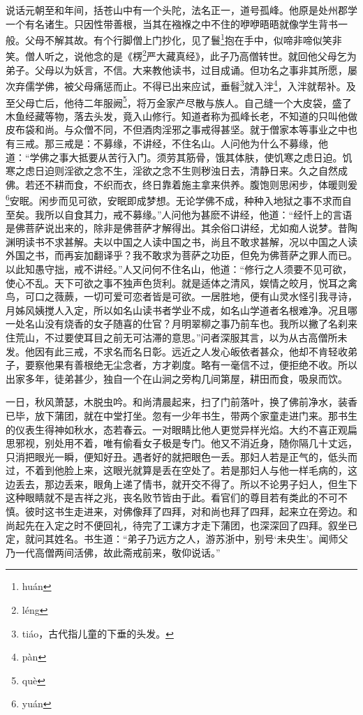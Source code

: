 \documentclass[a4paper,12pt,UTF8,twoside]{ctexbook}
\begin{document}
说话元朝至和年间，括苍山中有一个头陀，法名正一，道号孤峰。他原是处州郡学一个有名诸生。只因性带善根，当其在襁褓之中不住的咿咿晤晤就像学生背书一般。父母不解其故。有个行脚僧上门抄化，见了鬟\footnote{hu\'an}抱在手中，似啼非啼似笑非笑。僧人听之，说他念的是《楞\footnote{l\'eng}严大藏真经》，此子乃高僧转世。就回他父母乞为弟子。父母以为妖言，不信。大来教他读书，过目成诵。但功名之事非其所愿，屡次弃儒学佛，被父母痛惩而止。不得已出来应试，垂髫\footnote{ti\'ao，古代指儿童的下垂的头发。}就入泮\footnote{p\`an}，入泮就帮补。及至父母亡后，他待二年服阙\footnote{qu\`e}，将万金家产尽散与族人。自己缝一个大皮袋，盛了木鱼经藏等物，落去头发，竟入山修行。知道者称为孤峰长老，不知道的只叫他做皮布袋和尚。与众僧不同，不但酒肉淫邪之事戒得甚坚。就于僧家本等事业之中也有三戒。那三戒是：不募缘，不讲经，不住名山。人问他为什么不募缘，他道：“学佛之事大抵要从苦行入门。须劳其筋骨，饿其体肤，使饥寒之虑日迫。饥寒之虑日迫则淫欲之念不生，淫欲之念不生则秽浊日去，清静日来。久之自然成佛。若还不耕而食，不织而衣，终日靠着施主拿来供养。腹饱则思闲步，体暖则爰\footnote{yu\'an}安眠。闲步而见可欲，安眠即成梦想。无论学佛不成，种种入地狱之事不求而自至矣。我所以自食其力，戒不募缘。”人问他为甚麽不讲经，他道：“经忏上的言语是佛菩萨说出来的，除非是佛菩萨才解得出。其余俗口讲经，尤如痴人说梦。昔陶渊明读书不求甚解。夫以中国之人读中国之书，尚且不敢求甚解，况以中国之人读外国之书，而再妄加翻译乎？我不敢求为菩萨之功臣，但免为佛菩萨之罪人而已。以此知愚守拙，戒不讲经。”人又问何不住名山，他道：“修行之人须要不见可欲，使心不乱。天下可欲之事不独声色货利。就是适体之清风，娱情之皎月，悦耳之禽鸟，可口之薇蕨，一切可爱可恋者皆是可欲。一居胜地，便有山灵水怪引我寻诗，月姊风姨搅人入定，所以如名山读书者学业不成，如名山学道者名根难净。况且哪一处名山没有烧香的女子随喜的仕官？月明翠柳之事乃前车也。我所以撇了名刹来住荒山，不过要使耳目之前无可沽滞的意思。”问者深服其言，以为从古高僧所未发。他因有此三戒，不求名而名日彰。远近之人发心皈依者甚众，他却不肯轻收弟子，要察他果有善根绝无尘念者，方才剃度。略有一毫信不过，便拒绝不收。所以出家多年，徒弟甚少，独自一个在山涧之旁构几间第屋，耕田而食，吸泉而饮。

一日，秋风萧瑟，木脱虫吟。和尚清晨起来，扫了门前落叶，换了佛前净水，装香已毕，放下蒲团，就在中堂打坐。忽有一少年书生，带两个家童走进门来。那书生的仪表生得神如秋水，态若春云。一对眼睛比他人更觉异样光焰。大约不喜正观扁思邪视，别处用不着，唯有偷看女子极是专门。他又不消近身，随你隔几十丈远，只消把眼光一瞬，便知好丑。遇者好的就把眼色一丢。那妇人若是正气的，低头而过，不着到他脸上来，这眼光就算是丢在空处了。若是那妇人与他一样毛病的，这边丢去，那边丢来，眼角上递了情书，就开交不得了。所以不论男子妇人，但生下这种眼睛就不是吉祥之兆，丧名败节皆由于此。看官们的尊目若有类此的不可不慎。彼时这书生走进来，对佛像拜了四拜，对和尚也拜了四拜，起来立在旁边。和尚起先在入定之时不便回礼，待完了工课方才走下蒲团，也深深回了四拜。叙坐已定，就问其姓名。书生道：“弟子乃远方之人，游苏浙中，别号‘未央生’。闻师父乃一代高僧两间活佛，故此斋戒前来，敬仰说话。”
\end{document}
